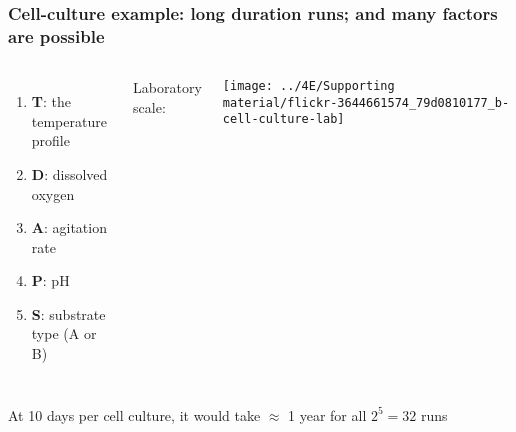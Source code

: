 \begin{frame}\frametitle{Cell-culture example: long duration runs; and many factors are possible}
	\begin{columns}[c]
			\begin{enumerate}
				\item	\textbf{T}: the temperature profile
				\item	\textbf{D}: dissolved oxygen
				\item	\textbf{A}: agitation rate
				\item	\textbf{P}: pH
				\item	\textbf{S}: substrate type (A or B)
			\end{enumerate}
		
			{\color{blue} \small Laboratory scale:} 
			
			\vspace{0.2cm}
			
			\centerline{\texttt{[image: ../4E/Supporting material/flickr-3644661574\_79d0810177\_b-cell-culture-lab]}}
	\end{columns}

	\vfill
	At 10 days per cell culture, it would take $\approx$ 1 year for all $2^5 = 32$ runs
	
\end{frame}

